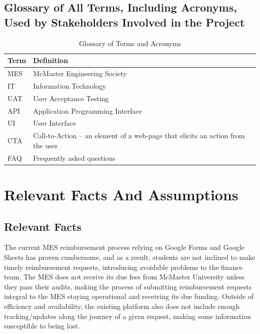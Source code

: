 \documentclass[12pt]{article}
\begin{document}
\subsection{Glossary of All Terms, Including Acronyms, Used by Stakeholders Involved in the Project}
\begin{table}[h]
    \centering
    \begin{tabular}{|>{\raggedright}p{3cm}|>{\raggedright\arraybackslash}p{10cm}|}
        \hline
        \textbf{Term} & \textbf{Definition} \\
        \hline
        MES & McMaster Engineering Society \\
        \hline
        IT & Information Technology \\
        \hline
        UAT & User Acceptance Testing \\
        \hline
        API & Application Programming Interface \\
        \hline
        UI & User Interface \\
        \hline
        CTA & Call-to-Action – an element of a web-page that elicits an action from the user \\
        \hline
        FAQ & Frequently asked questions \\
        \hline
    \end{tabular}
    \caption{Glossary of Terms and Acronyms}
    \label{tab:glossary}
\end{table}


\section{Relevant Facts And Assumptions}
\subsection{Relevant Facts}
The current MES reimbursement process relying on Google Forms and Google Sheets has proven cumbersome, and as a result, students are not inclined to make timely reimbursement requests, introducing avoidable problems to the finance team.
The MES does not receive its due fees from McMaster University unless they pass their audits, making the process of submitting reimbursement requests integral to the MES staying operational and receiving its due funding.
Outside of efficiency and availability, the existing platform also does not include enough tracking/updates along the journey of a given request, making some information susceptible to being lost.
\end{document}

